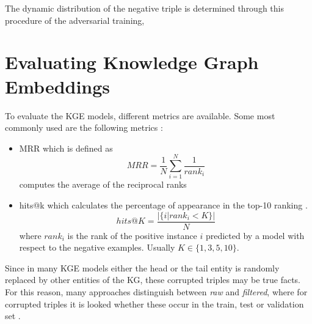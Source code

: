 The dynamic distribution of the negative triple is determined through this procedure of the adversarial training, 

\section{Evaluating Knowledge Graph Embeddings} 
To evaluate the \ac{KGE} models, different metrics are available.
Some most commonly used are the following metrics \cite{kotnis2017analysis}:
\begin{itemize}
    \item 
    \ac{MRR} which is defined as
    \begin{equation}
        MRR = \frac{1}{N} \sum_{i=1}^{N}\frac{1}{rank_i}
    \end{equation}
    computes the average of the reciprocal ranks \cite{zhang2021efficient}
    
    \item 
    hits@k which calculates the percentage of appearance in the top-10 ranking \cite{zhang2021efficient}.
    \begin{equation}
        hits@K = \frac{|\{i | rank_i < K\}|}{N}
    \end{equation}
    where $rank_i$ is the rank of the positive instance $i$ predicted by a model with respect to the negative examples.
    Usually $K \in \{1, 3, 5, 10\}$.
\end{itemize}
Since in many \ac{KGE} models either the head or the tail entity is randomly replaced by other entities of the KG, these corrupted triples may be true facts.
For this reason, many approaches distinguish between \textit{raw} and \textit{filtered}, where for corrupted triples it is looked whether these occur in the train, test or validation set \cite{TransE}.











